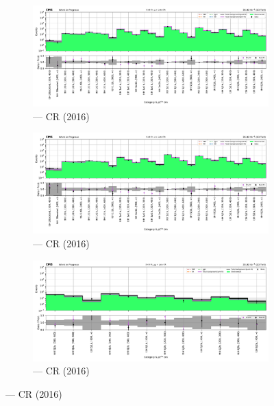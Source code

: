 \begin{figure}[htbp]
    \centering
    \begin{subfigure}[b]{0.66\textwidth}
        \includegraphics[width=\textwidth]{chapters/higgstoinv/figures/mountain_ranges/2016/ttH/Wmunu_tree_fit_s-abs_values_ttH_cats.pdf}
        \caption{\ttH --- \singleMuCr \gls{CR} (2016)}
    \end{subfigure}

    \begin{subfigure}[b]{0.66\textwidth}
        \includegraphics[width=\textwidth]{chapters/higgstoinv/figures/mountain_ranges/2016/ttH/Wenu_tree_fit_s-abs_values_ttH_cats.pdf}
        \caption{\ttH --- \singleEleCr \gls{CR} (2016)}
    \end{subfigure}

    \begin{subfigure}[b]{0.66\textwidth}
        \includegraphics[width=\textwidth]{chapters/higgstoinv/figures/mountain_ranges/2016/ttH/Zmumu_tree_fit_s-abs_values_ttH_cats.pdf}
        \caption{\ttH --- \doubleMuCr \gls{CR} (2016)}
    \end{subfigure}


\end{figure}
